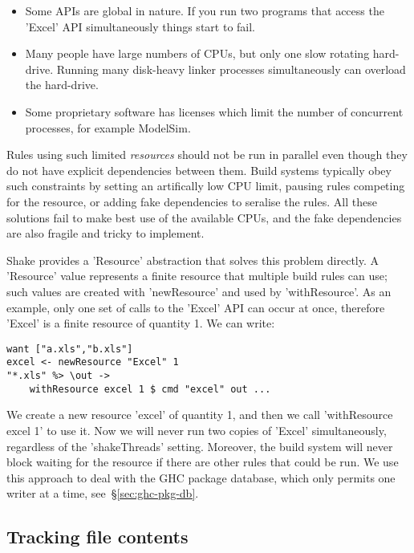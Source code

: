 \begin{itemize}
\item Some APIs are global in nature. If you run two programs that access the
\lst'Excel' API simultaneously things start to fail.
\item Many people have large numbers of CPUs, but only one slow rotating
hard-drive. Running many disk-heavy linker processes simultaneously can overload
the hard-drive.
\item Some proprietary software has licenses which limit the number of
concurrent processes, for example ModelSim.
\end{itemize}

Rules using such limited \emph{resources} should not be run in
parallel even though they do not have explicit dependencies between them. Build systems
typically obey such constraints by setting an artifically low CPU limit, pausing rules
competing for the resource, or adding fake dependencies to seralise the rules.
All these solutions fail to make best use of the available CPUs, and the fake
dependencies are also fragile and tricky to implement.

Shake provides a \lst'Resource' abstraction that solves this problem directly.
A \lst'Resource' value represents a finite resource that multiple build rules can use;
such values are created with \lst'newResource' and used by \lst'withResource'. As an
example, only one set of calls to the \lst'Excel' API can occur at once, therefore
\lst'Excel' is a finite resource of quantity 1. We can write:

\begin{lstlisting}
want ["a.xls","b.xls"]
excel <- newResource "Excel" 1
"*.xls" %> \out ->
    withResource excel 1 $ cmd "excel" out ...
\end{lstlisting}

\noindent We create a new resource \lst'excel' of quantity 1, and then we call
\lst'withResource excel 1' to use it. Now we will never run two copies of
\lst'Excel' simultaneously, regardless of the \lst'shakeThreads' setting.
Moreover, the build system will never block waiting for the resource if there
are other rules that could be run. We use this approach to deal with the GHC
package database, which only permits one writer at a time,
see~\S\ref{sec:ghc-pkg-db}.

\subsection{Tracking file contents\label{sec:file-contents}}

